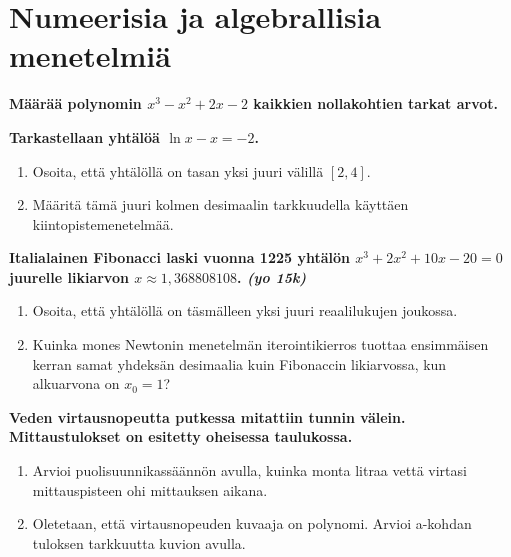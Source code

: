 \documentclass[12pt,finnish]{exam}
\begin{document}
 \section*{Numeerisia ja algebrallisia menetelmiä}
 
\vspace{5mm}
 
\begin{questions}

\bfseries
\question
\mdseries
Määrää polynomin \(x^3-x^2+2x-2\) kaikkien nollakohtien tarkat arvot.

\vspace{1ex}

\bfseries
\question
\mdseries
Tarkastellaan yhtälöä \(\ln x-x=-2\).
\begin{enumerate}[label=\textbf{\alph*)}]
\item Osoita, että yhtälöllä on tasan yksi juuri välillä \([2,4]\).
\item Määritä tämä juuri kolmen desimaalin tarkkuudella käyttäen kiintopistemenetelmää.
\end{enumerate}

\bfseries
\question
\mdseries
Italialainen Fibonacci laski vuonna 1225 yhtälön \(x^3+2x^2+10x-20=0\) juurelle likiarvon \(x\approx 1,\! 368808108\). \emph{(yo 15k)}
\begin{enumerate}[label=\textbf{\alph*)}]
\item Osoita, että yhtälöllä on täsmälleen yksi juuri reaalilukujen joukossa.
\item {Kuinka mones Newtonin menetelmän iterointikierros tuottaa ensimmäisen kerran samat yhdeksän desimaalia kuin Fibonaccin likiarvossa, kun alkuarvona on \(x_0=1\)?}
\end{enumerate}

\vspace{1ex}

\bfseries
\question
\mdseries
Veden virtausnopeutta putkessa mitattiin tunnin välein. Mittaustulokset on esitetty oheisessa taulukossa.
\begin{enumerate}[label=\textbf{\alph*)}]
\item Arvioi puolisuunnikassäännön avulla, kuinka monta litraa vettä virtasi mittauspisteen ohi mittauksen aikana.

\item Oletetaan, että virtausnopeuden kuvaaja on polynomi. Arvioi a-kohdan tuloksen tarkkuutta kuvion avulla.

\end{enumerate}



\end{questions}
\end{document}
